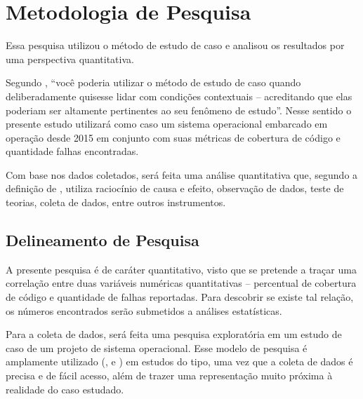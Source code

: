 \documentclass[11.5pt]{article}
\begin{document}


\section{Metodologia de Pesquisa}

Essa pesquisa utilizou o método de estudo de caso e analisou os resultados por uma perspectiva
quantitativa.

Segundo \cite{estudoDeCasoYin}, ``você poderia utilizar o método de estudo de caso quando
deliberadamente quisesse lidar com condições contextuais -- acreditando que elas poderiam ser
altamente pertinentes ao seu fenômeno de estudo''.
Nesse sentido o presente estudo utilizará como caso um sistema operacional embarcado em operação
desde 2015 em conjunto com suas métricas de cobertura de código e quantidade falhas encontradas.

Com base nos dados coletados, será feita uma análise quantitativa que, segundo
a definição de \cite{projetoDePesquisa}, utiliza raciocínio de causa e efeito, observação de dados,
teste de teorias, coleta de dados, entre outros instrumentos.


\subsection{Delineamento de Pesquisa}

A presente pesquisa é de caráter quantitativo, visto que se pretende a traçar uma correlação entre
duas variáveis numéricas quantitativas -- percentual de cobertura de código e quantidade de falhas
reportadas.
Para descobrir se existe tal relação, os números encontrados serão submetidos a análises
estatísticas.

Para a coleta de dados, será feita uma pesquisa exploratória em um estudo de caso de um projeto
de sistema operacional.
Esse modelo de pesquisa é amplamente utilizado (\cite{coverageMetaAnalysis}, \cite{unitTestedCrash}
e \cite{coverageLargeScaleStudy}) em estudos do tipo, uma vez que a coleta de dados é precisa e de
fácil acesso, além de trazer uma representação muito próxima à realidade do caso estudado.
\end{document}
